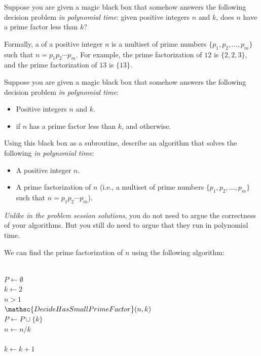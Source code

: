 
\item Suppose you are given a magic black box that somehow answers the following
decision problem \emph{in polynomial time}: given positive integers $n$ and $k$,
does $n$ have a prime factor less than $k$?

Formally, a  of a positive integer $n$ is a multiset
of prime numbers $\{p_1, p_2, \dots, p_m\}$ such that $n = p_1 p_2 \cdots p_m$.
For example, the prime factorization of $12$ is $\{2, 2, 3\}$, and the prime
factorization of $13$ is $\{13\}$.

Suppose you are given a magic black box that somehow answers the following
decision problem \emph{in polynomial time}:
\begin{itemize}
\item {} Positive integers $n$ and $k$.
\item {}  if $n$ has a prime factor less than $k$,
and  otherwise.
\end{itemize}
Using this black box as a subroutine, describe an algorithm that solves the
following  \emph{in polynomial time}:
\begin{itemize}
\item {} A positive integer $n$.
\item {} A prime factorization of $n$ (i.e., a multiset of prime
numbers $\{p_1, p_2, \dots, p_m\}$ such that $n = p_1 p_2 \cdots p_m$).
\end{itemize}

\emph{Unlike in the problem session solutions}, you do not need to argue the
correctness of your algorithms. But you still do need to argue that they run in
polynomial time.

\begin{Solution}
We can find the prime factorization of $n$ using the following algorithm:
\begin{algo}
\+
\\	$P \gets \emptyset$ \quad{}\+
\\	$k \gets 2$\+
\\	 $n > 1$ \+
\\		 $\mathsc{DecideHasSmallPrimeFactor}(n, k)$ \+
\\			$P \gets P \cup \{k\}$\+
\\			$n \gets n / k$\-
\\		\+
\\			$k \gets k + 1$\-
\end{algo}
\end{Solution}